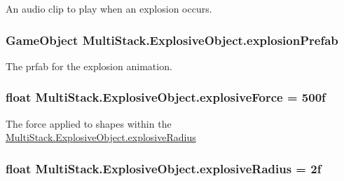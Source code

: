An audio clip to play when an explosion occurs. 

\hypertarget{class_multi_stack_1_1_explosive_object_a22de7a92e4da52f57888874f2d978f56}{}
\subsubsection[{explosion\+Prefab}]{\setlength{\rightskip}{0pt plus 5cm}Game\+Object Multi\+Stack.\+Explosive\+Object.\+explosion\+Prefab}\label{class_multi_stack_1_1_explosive_object_a22de7a92e4da52f57888874f2d978f56}


The prfab for the explosion animation. 

\hypertarget{class_multi_stack_1_1_explosive_object_abd25f5c7fec269baf7f18cafdb9a8f41}{}
\subsubsection[{explosive\+Force}]{\setlength{\rightskip}{0pt plus 5cm}float Multi\+Stack.\+Explosive\+Object.\+explosive\+Force = 500f}\label{class_multi_stack_1_1_explosive_object_abd25f5c7fec269baf7f18cafdb9a8f41}


The force applied to shapes within the \hyperlink{class_multi_stack_1_1_explosive_object_a409a2b47d8945963839fae41b038e1f5}{Multi\+Stack.\+Explosive\+Object.\+explosive\+Radius} 

\hypertarget{class_multi_stack_1_1_explosive_object_a409a2b47d8945963839fae41b038e1f5}{}
\subsubsection[{explosive\+Radius}]{\setlength{\rightskip}{0pt plus 5cm}float Multi\+Stack.\+Explosive\+Object.\+explosive\+Radius = 2f}\label{class_multi_stack_1_1_explosive_object_a409a2b47d8945963839fae41b038e1f5}


